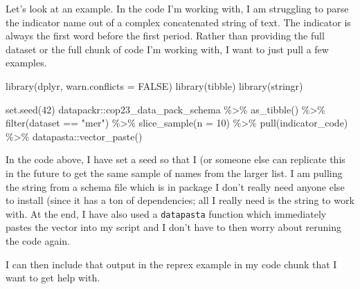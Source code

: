 \documentclass[
  letterpaper,
  DIV=11,
  numbers=noendperiod]{scrreprt}
\newenvironment{Shaded}{\begin{snugshade}}{\end{snugshade}}
\newcommand{\AttributeTok}[1]{\textcolor[rgb]{0.40,0.45,0.13}{#1}}
\newcommand{\ConstantTok}[1]{\textcolor[rgb]{0.56,0.35,0.01}{#1}}
\newcommand{\DecValTok}[1]{\textcolor[rgb]{0.68,0.00,0.00}{#1}}
\newcommand{\FunctionTok}[1]{\textcolor[rgb]{0.28,0.35,0.67}{#1}}
\newcommand{\NormalTok}[1]{\textcolor[rgb]{0.00,0.23,0.31}{#1}}
\newcommand{\SpecialCharTok}[1]{\textcolor[rgb]{0.37,0.37,0.37}{#1}}
\newcommand{\StringTok}[1]{\textcolor[rgb]{0.13,0.47,0.30}{#1}}
\begin{document}
Let's look at an example. In the code I'm working with, I am struggling
to parse the indicator name out of a complex concatenated string of
text. The indicator is always the first word before the first period.
Rather than providing the full dataset or the full chunk of code I'm
working with, I want to just pull a few examples.

\begin{Shaded}
\begin{Highlighting}[]
\FunctionTok{library}\NormalTok{(dplyr, }\AttributeTok{warn.conflicts =} \ConstantTok{FALSE}\NormalTok{)}
\FunctionTok{library}\NormalTok{(tibble)}
\FunctionTok{library}\NormalTok{(stringr)}

\FunctionTok{set.seed}\NormalTok{(}\DecValTok{42}\NormalTok{)}
\NormalTok{datapackr}\SpecialCharTok{::}\NormalTok{cop23\_data\_pack\_schema }\SpecialCharTok{\%\textgreater{}\%}
  \FunctionTok{as\_tibble}\NormalTok{() }\SpecialCharTok{\%\textgreater{}\%}
  \FunctionTok{filter}\NormalTok{(dataset }\SpecialCharTok{==} \StringTok{"mer"}\NormalTok{) }\SpecialCharTok{\%\textgreater{}\%}
  \FunctionTok{slice\_sample}\NormalTok{(}\AttributeTok{n =} \DecValTok{10}\NormalTok{) }\SpecialCharTok{\%\textgreater{}\%}
  \FunctionTok{pull}\NormalTok{(indicator\_code) }\SpecialCharTok{\%\textgreater{}\%}
\NormalTok{  datapasta}\SpecialCharTok{::}\FunctionTok{vector\_paste}\NormalTok{()}
\end{Highlighting}
\end{Shaded}

In the code above, I have set a seed so that I (or someone else can
replicate this in the future to get the same sample of names from the
larger list. I am pulling the string from a schema file which is in
package I don't really need anyone else to install (since it has a ton
of dependencies; all I really need is the string to work with. At the
end, I have also used a \texttt{datapasta} function which immediately
pastes the vector into my script and I don't have to then worry about
reruning the code again.

I can then include that output in the reprex example in my code chunk
that I want to get help with.
\end{document}
